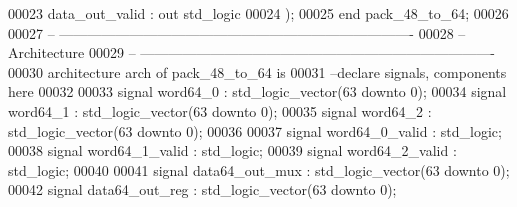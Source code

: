 \begin{DoxyCode}
00023       \textcolor{vhdlchar}{data_out_valid} \textcolor{vhdlchar}{:} \textcolor{keywordflow}{out} \textcolor{comment}{std\_logic}
00024         \textcolor{vhdlchar}{)};
00025 \textcolor{keywordflow}{end} \textcolor{vhdlchar}{pack\_48\_to\_64};
00026 
00027 \textcolor{keyword}{-- ----------------------------------------------------------------------------}
00028 \textcolor{keyword}{-- Architecture}
00029 \textcolor{keyword}{-- ----------------------------------------------------------------------------}
00030 \textcolor{keywordflow}{architecture} arch \textcolor{keywordflow}{of} pack_48_to_64 is
00031 \textcolor{keyword}{--declare signals,  components here}
00032 
00033 \textcolor{keywordflow}{signal} \textcolor{vhdlchar}{word64_0}            \textcolor{vhdlchar}{:} \textcolor{comment}{std\_logic\_vector}\textcolor{vhdlchar}{(}\textcolor{vhdllogic}{}\textcolor{vhdllogic}{63} \textcolor{keywordflow}{downto} \textcolor{vhdllogic}{}\textcolor{vhdllogic}{0}\textcolor{vhdlchar}{)};
00034 \textcolor{keywordflow}{signal} \textcolor{vhdlchar}{word64_1}            \textcolor{vhdlchar}{:} \textcolor{comment}{std\_logic\_vector}\textcolor{vhdlchar}{(}\textcolor{vhdllogic}{}\textcolor{vhdllogic}{63} \textcolor{keywordflow}{downto} \textcolor{vhdllogic}{}\textcolor{vhdllogic}{0}\textcolor{vhdlchar}{)};
00035 \textcolor{keywordflow}{signal} \textcolor{vhdlchar}{word64_2}            \textcolor{vhdlchar}{:} \textcolor{comment}{std\_logic\_vector}\textcolor{vhdlchar}{(}\textcolor{vhdllogic}{}\textcolor{vhdllogic}{63} \textcolor{keywordflow}{downto} \textcolor{vhdllogic}{}\textcolor{vhdllogic}{0}\textcolor{vhdlchar}{)};
00036 
00037 \textcolor{keywordflow}{signal} \textcolor{vhdlchar}{word64_0_valid}      \textcolor{vhdlchar}{:} \textcolor{comment}{std\_logic};
00038 \textcolor{keywordflow}{signal} \textcolor{vhdlchar}{word64_1_valid}      \textcolor{vhdlchar}{:} \textcolor{comment}{std\_logic};
00039 \textcolor{keywordflow}{signal} \textcolor{vhdlchar}{word64_2_valid}      \textcolor{vhdlchar}{:} \textcolor{comment}{std\_logic};
00040 
00041 \textcolor{keywordflow}{signal} \textcolor{vhdlchar}{data64_out_mux}      \textcolor{vhdlchar}{:} \textcolor{comment}{std\_logic\_vector}\textcolor{vhdlchar}{(}\textcolor{vhdllogic}{}\textcolor{vhdllogic}{63} \textcolor{keywordflow}{downto} \textcolor{vhdllogic}{}\textcolor{vhdllogic}{0}\textcolor{vhdlchar}{)};
00042 \textcolor{keywordflow}{signal} \textcolor{vhdlchar}{data64_out_reg}      \textcolor{vhdlchar}{:} \textcolor{comment}{std\_logic\_vector}\textcolor{vhdlchar}{(}\textcolor{vhdllogic}{}\textcolor{vhdllogic}{63} \textcolor{keywordflow}{downto} \textcolor{vhdllogic}{}\textcolor{vhdllogic}{0}\textcolor{vhdlchar}{)};

\end{DoxyCode}
